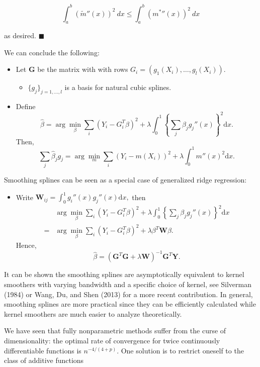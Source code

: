 \documentclass[a4paper,12pt,openany]{book}
\providecommand{\tightlist}{%
 \setlength{\itemsep}{0pt}\setlength{\parskip}{0pt}}
\begin{document}
\[
\int_a^b(\tilde m''(x))^2\ dx\le \int_a^b({m^*}''(x))^2\ dx
\]

as desired. \(\blacksquare\)

We can conclude the following:

\begin{itemize}
\tightlist
\item
  Let \(\mathbf G\) be the matrix with with rows \(G_i=(g_1(X_i), \dots, g_l(X_i))\).

  \begin{itemize}
  \tightlist
  \item
    \(\{g_j\}_{j=1,\dots,l}\) is a basis for natural cubic splines.
  \end{itemize}
\item
  Define
  \[\hat \beta  = \arg\min_{\beta} \sum_i (Y_i- G_i^T\beta)^2+\lambda\int_0^1 \left\{{\sum_j \beta_jg_j''}(x)\right\}^2\mathrm dx.\]
  Then,
  \[\sum_j \hat \beta_j g_j=\arg\min_{m} \sum_i (Y_i-m(X_i))^2+\lambda\int_0^1 m''(x)^2\mathrm dx.\]
\end{itemize}

Smoothing splines can be seen as a special case of generalized ridge regression:

\begin{itemize}
\tightlist
\item
  Write \(\mathbf W_{ij}=\int_0^1g_i''(x)g_j''(x)\mathrm dx,\) then
  \begin{align*}
    &\arg\min_{\beta} \sum_i (Y_i- G_i^T\beta)^2+\lambda\int_0^1 \left\{{\sum_j \beta_jg_j''}(x)\right\}^2\mathrm dx\\=
    &\arg\min_{\beta} \sum_i (Y_i- G_i^T\beta)^2+\lambda \beta^T \mathbf W \beta.
    \end{align*}
  Hence,
  \[
    \hat \beta= (\mathbf G^T\mathbf G+\lambda \mathbf W)^{-1}\mathbf G^T\mathbf Y.
    \]
\end{itemize}

It can be shown the smoothing splines are asymptotically equivalent to kernel smoothers with varying bandwidth and a specific choice of kernel, see Silverman (1984) or Wang, Du, and Shen (2013) for a more recent contribution. In general, smoothing splines are more practical since they can be efficiently calculated while kernel smoothers are much easier to analyze theoretically.

We have seen that fully nonparametric methods suffer from the curse of dimensionality: the optimal rate of convergence for twice continuously differentiable functions is \(n^{-4/(4+p)}\). One solution is to restrict oneself to the class of additive functions
\end{document}
